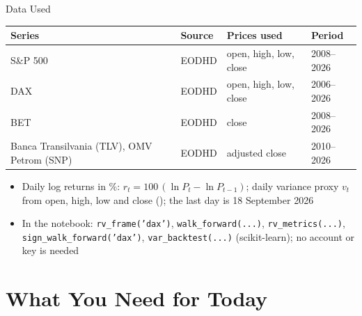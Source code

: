 \begin{frame}{Data Used}
\itemsize{\small}
\begin{center}
\footnotesize
\begin{tabular}{llll}
\toprule
\textbf{Series} & \textbf{Source} & \textbf{Prices used} & \textbf{Period} \\
\midrule
S\&P 500 & EODHD & open, high, low, close & 2008--2026 \\
DAX & EODHD & open, high, low, close & 2006--2026 \\
BET & EODHD & close & 2008--2026 \\
Banca Transilvania (TLV), OMV Petrom (SNP) & EODHD & adjusted close & 2010--2026 \\
\bottomrule
\end{tabular}
\end{center}
\begin{itemize}
    \item Daily log returns in \%: $r_t = 100\,(\ln P_t - \ln P_{t-1})$; daily variance proxy $v_t$ from open, high, low and close (); the last day is 18 September 2026
    \item In the notebook: \texttt{rv\_frame('dax')}, \texttt{walk\_forward(...)}, \texttt{rv\_metrics(...)}, \texttt{sign\_walk\_forward('dax')}, \texttt{var\_backtest(...)} (scikit-learn); no account or key is needed
\end{itemize}
\end{frame}


\section{What You Need for Today}

